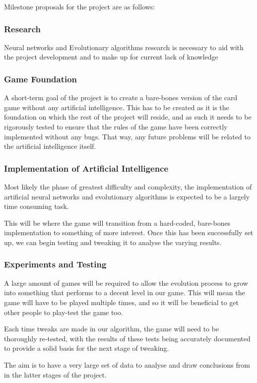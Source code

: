 \documentclass[12pt,a4paper]{article}
\begin{document}
Milestone proposals for the project are as follows: 
\subsubsection{Research}
Neural networks and Evolutionary algorithms research is necessary to aid with the project development and to make up for current lack of knowledge

\subsubsection{Game Foundation}
A short-term goal of the project is to create a bare-bones version of the card game without any artificial intelligence. This has to be created as it is the foundation on which the rest of the project will reside, and as such it needs to be rigorously tested to ensure that the rules of the game have been correctly implemented without any bugs. That way, any future problems will be related to the artificial intelligence itself.

\subsubsection{Implementation of Artificial Intelligence}
Most likely the phase of greatest difficulty and complexity, the implementation of artificial neural networks and evolutionary algorithms is expected to be a largely time consuming task. 

This will be where the game will transition from a hard-coded, bare-bones implementation to something of more interest. Once this has been successfully set up, we can begin testing and tweaking it to analyse the varying results.

\subsubsection{Experiments and Testing}
A large amount of games will be required to allow the evolution process to grow into something that performs to a decent level in our game. This will mean the game will have to be played multiple times, and so it will be beneficial to get other people to play-test the game too. 

Each time tweaks are made in our algorithm, the game will need to be thoroughly re-tested, with the results of these tests being accurately documented to provide a solid basis for the next stage of tweaking. 

The aim is to have a very large set of data to analyse and draw conclusions from in the latter stages of the project. 
\end{document}
